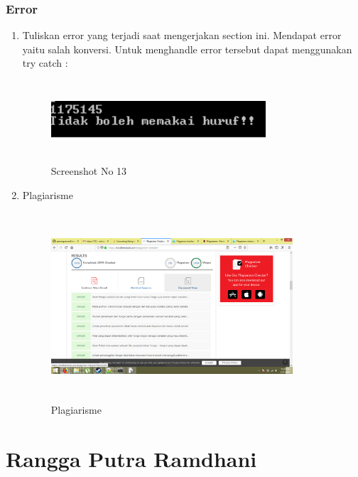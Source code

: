 \subsubsection{Error}
\begin{enumerate}
	\item Tuliskan error yang terjadi saat mengerjakan section ini. Mendapat error yaitu salah konversi. Untuk menghandle error tersebut dapat menggunakan try catch :
	
	
	\begin{figure}[!htbp]
        \centering
        \includegraphics[height=3cm, width=8cm]{figures/chapter3/1174035_error.png}
        \caption{Screenshot No 13}
        \label{1174035_error}
	\end{figure}
	\item Plagiarisme
	\begin{figure}[!htbp]
        \centering
        \includegraphics[height=7cm, width=9cm]{figures/chapter3/1174035_plagiarisme.png}
        \caption{Plagiarisme}
        \label{1174035_plagiarisme}
	\end{figure}
\end{enumerate}

\section{Rangga Putra Ramdhani}
